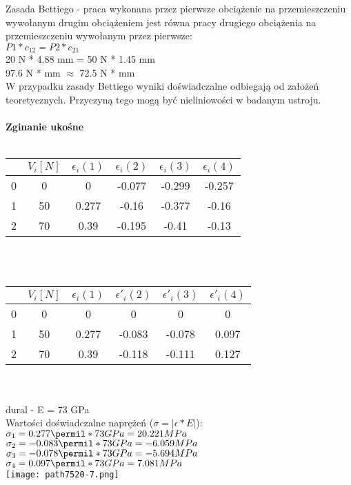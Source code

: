 \documentclass[11pt]{article}
\begin{document}
Zasada Bettiego - praca wykonana przez pierwsze obciążenie na przemieszczeniu wywołanym drugim obciążeniem jest równa pracy drugiego obciążenia na przemieszczeniu wywołanym przez pierwsze:\\
$P1 * c_{12} = P2 * c_{21}$\\
20 N * 4.88 mm = 50 N * 1.45 mm\\
97.6 N * mm $\approx$ 72.5 N * mm\\
W przypadku zasady Bettiego wyniki doświadczalne odbiegają od założeń teoretycznych. Przyczyną tego mogą być nieliniowości w badanym ustroju.\\\\


\textbf{Zginanie ukośne}\\\\
\begin{tabular}{|c|c|c|c|c|c|}\hline
$ $ & $V_i[N]$ & $\epsilon_i(1)$ & $\epsilon_i(2)$ & $\epsilon_i(3)$ & $\epsilon_i(4)$ \\ \hline
0 & 0 & 0 & -0.077 & -0.299 & -0.257 \\ \hline
1 & 50 & 0.277 & -0.16 & -0.377 & -0.16 \\ \hline
2 & 70 & 0.39 & -0.195 & -0.41 & -0.13 \\ \hline
\end{tabular}\\\\
\begin{tabular}{|c|c|c|c|c|c|}\hline
$ $ & $V_i[N]$ & $\epsilon_i(1)$ & $\epsilon'_i(2)$ & $\epsilon'_i(3)$ & $\epsilon'_i(4)$ \\ \hline
0 & 0 & 0 & 0 & 0 & 0 \\ \hline
1 & 50 & 0.277 & -0.083 & -0.078 & 0.097 \\ \hline
2 & 70 & 0.39 & -0.118 & -0.111 & 0.127 \\ \hline
\end{tabular}\\\\
dural - E = 73 GPa\\
Wartości doświadczalne naprężeń ($\sigma = |\epsilon * E|$):\\
$\sigma_1 = 0.277\permil * 73 GPa = 20.221 MPa$\\
$\sigma_2 = -0.083\permil * 73 GPa = -6.059 MPa$\\
$\sigma_3 = -0.078\permil * 73 GPa = -5.694 MPa$\\
$\sigma_4 = 0.097\permil * 73 GPa = 7.081 MPa$\\
\texttt{[image: path7520-7.png]}\\
\end{document}
